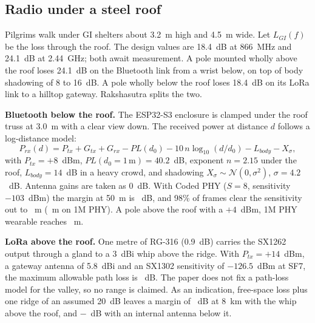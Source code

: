 \documentclass[11pt,a4paper]{article}
\begin{document}
\subsection{Radio under a steel roof}
Pilgrims walk under GI shelters about 3.2~m high and 4.5~m wide. Let $L_{GI}(f)$ be the loss through the roof. The
design values are 18.4~dB at 866~MHz and 24.1~dB at 2.44~GHz; both await measurement. A pole mounted wholly above the
roof loses 24.1~dB on the Bluetooth link from a wrist below, on top of body shadowing of 8 to 16~dB. A pole wholly below
the roof loses 18.4~dB on its LoRa link to a hilltop gateway. Rakshasutra splits the two.

\textbf{Bluetooth below the roof.} The ESP32-S3 enclosure is clamped under the roof truss at 3.0~m with a clear view
down. The received power at distance $d$ follows a log-distance model:
\begin{equation}P_{rx}(d)=P_{tx}+G_{tx}+G_{rx}-PL(d_0)-10\,n\log_{10}(d/d_0)-L_{body}-X_\sigma,\label{eq:ble}\end{equation}
with $P_{tx}=+8$~dBm, $PL(d_0{=}1\,\mathrm{m})=40.2$~dB, exponent $n=2.15$ under the roof, $L_{body}=14$~dB in a heavy
crowd, and shadowing $X_\sigma\sim\mathcal N(0,\sigma^2)$, $\sigma=4.2$~dB. Antenna gains are taken as 0~dB. With
Coded PHY ($S=8$, sensitivity $-103$~dBm) \cite{btcore} the margin at 50~m is \MarginFifty~dB, and 98\% of frames clear
the sensitivity out to \RangeCoded~m (\RangeOneM~m on 1M PHY). A pole above the roof with a $+4$~dBm, 1M PHY wearable
reaches \RangeAbove~m.

\textbf{LoRa above the roof.} One metre of RG-316 (0.9~dB) carries the SX1262 output through a gland to a 3~dBi whip
above the ridge. With $P_{tx}=+14$~dBm, a gateway antenna of 5.8~dBi and an SX1302 sensitivity of $-126.5$~dBm at SF7, the
maximum allowable path loss is \Mapl~dB. The paper does not fix a path-loss model for the valley, so no range is
claimed. As an indication, free-space loss plus one ridge of an assumed 20~dB leaves a margin of \MarginEightOver~dB at
8~km with the whip above the roof, and $-$\MarginEightUnder~dB with an internal antenna below it.

\begin{table}[htb]\centering\footnotesize
\caption{Link budget recomputed from Eq.~\ref{eq:ble} and the stated parameters (calculated, not measured). Bluetooth
rows give the distance at which 98\% of frames clear the receiver sensitivity; LoRa rows give the margin at 8~km behind
one assumed 20~dB ridge.}\label{tab:link}
\TableLink\end{table}
\end{document}
